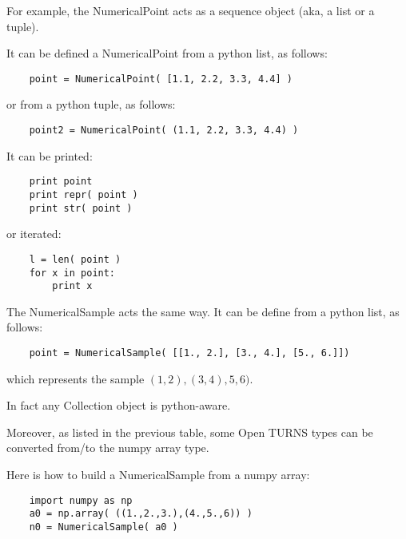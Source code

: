 For example, the NumericalPoint acts as a sequence object (aka, a list or a tuple).

It can be defined a NumericalPoint from a python list, as follows:
\begin{center}
  \begin{lstlisting}
    point = NumericalPoint( [1.1, 2.2, 3.3, 4.4] )
  \end{lstlisting}
\end{center}

or from a python tuple, as follows:
\begin{center}
  \begin{lstlisting}
    point2 = NumericalPoint( (1.1, 2.2, 3.3, 4.4) )
  \end{lstlisting}
\end{center}

It can be printed:
\begin{center}
  \begin{lstlisting}
    print point
    print repr( point )
    print str( point )
  \end{lstlisting}
\end{center}

or iterated:
\begin{center}
  \begin{lstlisting}
    l = len( point )
    for x in point:
        print x
  \end{lstlisting}
\end{center}

The NumericalSample acts the same way. It can be define from a python list, as follows:
\begin{center}
  \begin{lstlisting}
    point = NumericalSample( [[1., 2.], [3., 4.], [5., 6.]])
  \end{lstlisting}
\end{center}
which represents the sample $(1,2), (3,4), 5,6)$.


In fact any Collection object is python-aware.

Moreover, as listed in the previous table, some Open TURNS types can be converted from/to the numpy array type.

Here is how to build a NumericalSample from a numpy array:
\begin{center}
  \begin{lstlisting}
    import numpy as np
    a0 = np.array( ((1.,2.,3.),(4.,5.,6)) )
    n0 = NumericalSample( a0 )
  \end{lstlisting}
\end{center}

